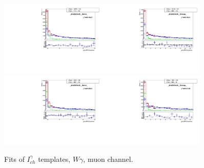 \begin{figure}[htb]
\begin{center}
   \includegraphics[width=0.45\textwidth]{../figs/figs_v11/MUON_WGamma/TemplateFits/c_TEMPL_CHISO_UNblind__phoEt25to30__Barrel__RooFit.pdf}\includegraphics[width=0.45\textwidth]{../figs/figs_v11/MUON_WGamma/TemplateFits/c_TEMPL_CHISO_UNblind__phoEt25to30__Endcap__RooFit.pdf}\\
   \includegraphics[width=0.45\textwidth]{../figs/figs_v11/MUON_WGamma/TemplateFits/c_TEMPL_CHISO_UNblind__phoEt30to35__Barrel__RooFit.pdf}\includegraphics[width=0.45\textwidth]{../figs/figs_v11/MUON_WGamma/TemplateFits/c_TEMPL_CHISO_UNblind__phoEt30to35__Endcap__RooFit.pdf}\\
  \label{fig:templateFits_CHISO_MUON_1}
  \caption{Fits of $I_{ch}^{\gamma}$ templates, $W\gamma$, muon channel.}
  \end{center}
\end{figure}

